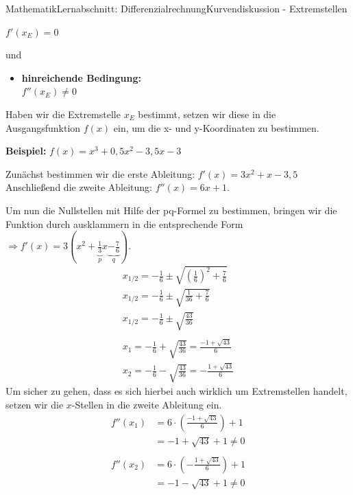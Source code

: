 \documentclass[11pt,twocolumn,oneside,openany,headings=optiontotoc,11pt,numbers=noenddot]{article}
\begin{document}
\begin{worksheet}{Mathematik}{Lernabschnitt: Differenzialrechnung}{Kurvendiskussion - Extremstellen}
\begin{framed}
\begin{itemize}[label=-]
				\(f'(x_E) = 0\)
			\end{itemize}
			und
			\begin{itemize}[label=-]
				\item  \textbf{hinreichende Bedingung:}\\
				\(f''(x_E) \neq 0\)
			\end{itemize}
		\end{framed}
		\noindent
		Haben wir die Extremstelle \(x_E\) bestimmt, setzen wir diese in die Ausgangsfunktion \(f(x)\) ein, um die x- und y-Koordinaten zu bestimmen.\\
		\par\noindent
		\textbf{Beispiel:} \(f(x) = x^3 + 0,5x^2 - 3,5x -3\)\\
		\par\noindent
		Zunächst bestimmen wir die erste Ableitung: \(f'(x) = 3x^2 + x - 3,5\)\\
		Anschließend die zweite Ableitung: \(f''(x) = 6x + 1\).\\
		\par\noindent
		Um nun die Nullstellen mit Hilfe der pq-Formel zu bestimmen, bringen wir die Funktion durch ausklammern in die entsprechende Form \(\Rightarrow f'(x) = 3(x^2+\underbrace{\frac{1}{3}}_{p}x\underbrace{-\frac{7}{6}}_{q})\).\\
		\begin{align*}
			x_{1/2} = -\frac{1}{6}\pm\sqrt{\left(\frac{1}{6}\right)^2 +\frac{7}{6}}\\
			x_{1/2} = -\frac{1}{6}\pm\sqrt{\frac{1}{36}+\frac{7}{6}}\\
			x_{1/2} = - \frac{1}{6}\pm\sqrt{\frac{43}{36}}\\
			\\
			x_1 = - \frac{1}{6}+\sqrt{\frac{43}{36}} = \frac{-1+\sqrt{43}}{6}\\
			x_2 = - \frac{1}{6}-\sqrt{\frac{43}{36}} = -\frac{1+\sqrt{43}}{6}
		\end{align*}
		Um sicher zu gehen, dass es sich hierbei auch wirklich um Extremstellen handelt, setzen wir die \(x\)-Stellen in die zweite Ableitung ein.\\
		\begin{align*}
			f''(x_1) & = 6\cdot{}\left(\frac{-1+\sqrt{43}}{6}\right) + 1\\
			& = -1+\sqrt{43} + 1 \neq 0\\
			\\
			f''(x_2) &=  6\cdot{}\left(-\frac{1+\sqrt{43}}{6}\right) + 1\\
			& = -1-\sqrt{43} + 1 \neq 0\\

\end{align*}
\end{worksheet}
\end{document}
